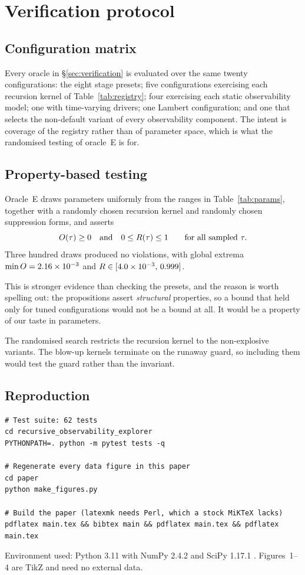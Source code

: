 \section{Verification protocol}
\label{app:verification}

\subsection{Configuration matrix}

Every oracle in \S\ref{sec:verification} is evaluated over the same twenty
configurations: the eight stage presets; five configurations exercising each
recursion kernel of Table~\ref{tab:registry}; four exercising each static
observability model; one with time-varying drivers; one Lambert configuration;
and one that selects the non-default variant of every observability component.
The intent is coverage of the registry rather than of parameter space, which is
what the randomised testing of oracle~E is for.

\subsection{Property-based testing}

Oracle~E draws parameters uniformly from the ranges in
Table~\ref{tab:params}, together with a randomly chosen recursion kernel and
randomly chosen suppression forms, and asserts
\begin{equation}
  O(\tau) \geq 0 \quad\text{and}\quad 0 \leq R(\tau) \leq 1
  \qquad \text{for all sampled } \tau .
\end{equation}
Three hundred draws produced no violations, with global extrema
$\min O = 2.16\times10^{-3}$ and $R \in [4.0\times10^{-3},\,0.999]$.

This is stronger evidence than checking the presets, and the reason is worth
spelling out: the propositions assert \emph{structural} properties, so a bound
that held only for tuned configurations would not be a bound at all. It would be
a property of our taste in parameters.

The randomised search restricts the recursion kernel to the non-explosive
variants. The blow-up kernels terminate on the runaway guard, so including them
would test the guard rather than the invariant.

\subsection{Reproduction}

\begin{verbatim}
# Test suite: 62 tests
cd recursive_observability_explorer
PYTHONPATH=. python -m pytest tests -q

# Regenerate every data figure in this paper
cd paper
python make_figures.py

# Build the paper (latexmk needs Perl, which a stock MiKTeX lacks)
pdflatex main.tex && bibtex main && pdflatex main.tex && pdflatex main.tex
\end{verbatim}

Environment used: Python 3.11 with NumPy 2.4.2 and SciPy 1.17.1
\citep{harris2020numpy,virtanen2020scipy}. Figures~1--4 are TikZ and need no
external data.

